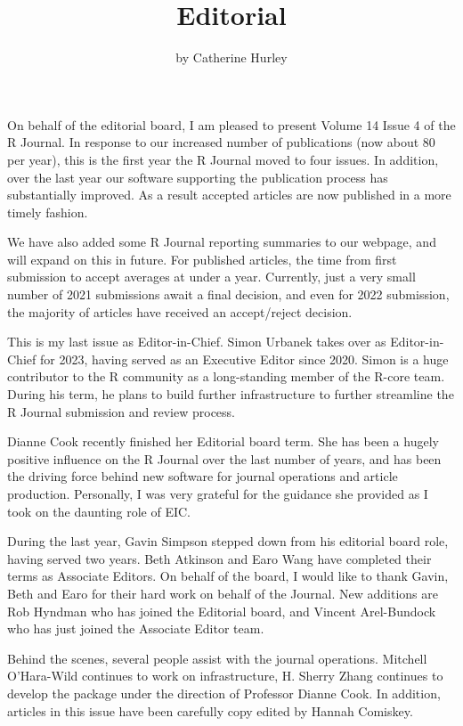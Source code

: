 \title{Editorial}
\author{by Catherine Hurley}

\maketitle


On behalf of the editorial board, I am pleased to present Volume 14 Issue 4 of the R Journal. In response to our increased number of publications (now about 80 per year), this is the first year the R Journal moved to four issues. In addition, over the last year our software supporting the publication process has substantially improved. As a result accepted articles are now published in a more timely fashion.

We have also added some R Journal reporting summaries to our webpage, and will expand on this in future.
For published articles, the time from first submission to accept averages at under a year.
Currently, just a very small number of 2021 submissions await a final decision, and even for 2022 submission, the majority of articles have received an accept/reject decision.

This is my last issue as Editor-in-Chief. Simon Urbanek takes over as Editor-in-Chief for 2023, having served as an Executive Editor since 2020. Simon is a huge contributor to the R community as a long-standing member of the R-core team. During his term, he plans to build further infrastructure to further streamline the R Journal submission and review process.

Dianne Cook recently finished her Editorial board term. She has been a hugely positive influence on the R Journal over the last number of years, and has been the driving force behind new software for journal operations and article production. Personally, I was very grateful for the guidance she provided as I took on the daunting role of EIC.

During the last year, Gavin Simpson stepped down from his editorial board role, having served two years. Beth Atkinson and Earo Wang have completed their terms as Associate Editors. On behalf of the board, I would like to thank Gavin, Beth and Earo for their hard work on behalf of the Journal.
New additions are Rob Hyndman who has joined the Editorial board, and Vincent Arel-Bundock who has just joined the Associate Editor team.

Behind the scenes, several people assist with the journal operations. Mitchell O'Hara-Wild continues to work on infrastructure, H. Sherry Zhang continues to develop the  package under the direction of Professor Dianne Cook. In addition, articles in this issue have been carefully copy edited by Hannah Comiskey.


